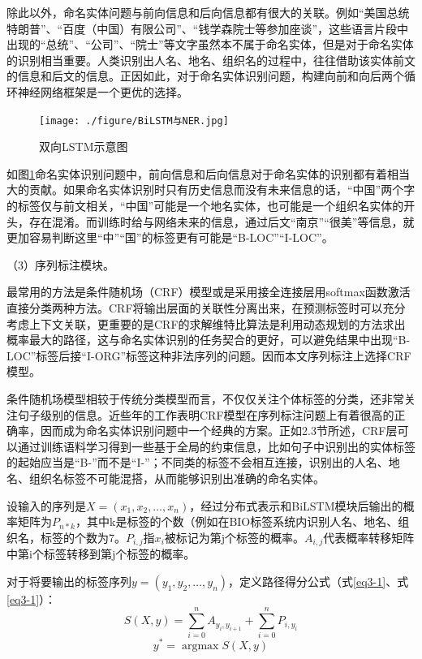 \documentclass[winfonts,master,oneside,nobackinfo]{njuthesis}
\begin{document}
除此以外，命名实体问题与前向信息和后向信息都有很大的关联。例如“美国总统特朗普”、“百度（中国）有限公司”、“钱学森院士等参加座谈”，这些语言片段中出现的“总统”、“公司”、“院士”等文字虽然本不属于命名实体，但是对于命名实体的识别相当重要。人类识别出人名、地名、组织名的过程中，往往借助该实体前文的信息和后文的信息。正因如此，对于命名实体识别问题，构建向前和向后两个循环神经网络框架是一个更优的选择。

\begin{figure}[h]
\centering
\texttt{[image: ./figure/BiLSTM与NER.jpg]}
\caption{双向LSTM示意图}
\label{bilstm}
\end{figure}

如图\ref{bilstm}命名实体识别问题中，前向信息和后向信息对于命名实体的识别都有着相当大的贡献。如果命名实体识别时只有历史信息而没有未来信息的话，“中国”两个字的标签仅与前文相关，“中国”可能是一个地名实体，也可能是一个组织名实体的开头，存在混淆。而训练时给与网络未来的信息，通过后文“南京”“很美”等信息，就更加容易判断这里“中”“国”的标签更有可能是“B-LOC”“I-LOC”。

（3）序列标注模块。

最常用的方法是条件随机场（CRF）模型或是采用接全连接层用softmax函数激活直接分类两种方法。CRF将输出层面的关联性分离出来，在预测标签时可以充分考虑上下文关联，更重要的是CRF的求解维特比算法是利用动态规划的方法求出概率最大的路径，这与命名实体识别的任务契合的更好，可以避免结果中出现“B-LOC”标签后接“I-ORG”标签这种非法序列的问题。因而本文序列标注上选择CRF模型。

条件随机场模型相较于传统分类模型而言，不仅仅关注个体标签的分类，还非常关注句子级别的信息。近些年的工作表明CRF模型在序列标注问题上有着很高的正确率，因而成为命名实体识别问题中一个经典的方案。正如2.3节所述，CRF层可以通过训练语料学习得到一些基于全局的约束信息，比如句子中识别出的实体标签的起始应当是“B-”而不是“I-”；不同类的标签不会相互连接，识别出的人名、地名、组织名标签不可能混搭，从而能够识别出准确的命名实体。

设输入的序列是$X=\left(x_{1}, x_{2}, \ldots, x_{n}\right)$，经过分布式表示和BiLSTM模块后输出的概率矩阵为$P_{n * k}$，其中k是标签的个数（例如在BIO标签系统内识别人名、地名、组织名，标签的个数为7。$P_{i, j}$指$x_{i}$被标记为第j个标签的概率。$A_{i, j}$代表概率转移矩阵中第i个标签转移到第j个标签的概率。

对于将要输出的标签序列$y=\left(y_{1}, y_{2}, \ldots, y_{n}\right)$，定义路径得分公式（式\ref{eq3-1}、式\ref{eq3-1}）：
\begin{equation}
S(X, y)=\sum_{i=0}^{n} A_{y_{i}, y_{i+1}}+\sum_{i=0}^{n} P_{i, y_{i}} 
\label{eq3-1}
\end{equation}
\begin{equation}
y^{*}=\operatorname{argmax} S(X, y)
\label{eq3-2}
\end{equation}
\end{document}
